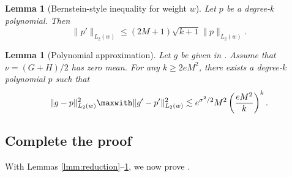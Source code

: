\documentclass[letterpaper,11pt]{article}
\newcommand{\pth}[1]{\left( #1 \right)}
\newtheorem{lemma}[theorem]{Lemma}
\theoremstyle{definition}
\begin{document}
    \begin{lemma}[Bernstein-style inequality for weight $w$]
      \label{lmm:bernstein}
      Let $p$ be a degree-$k$ polynomial.  Then
      \[
        \|p'\|_{L_2(w)}
        \leq (2M+1)\sqrt{k+1} \|p\|_{L_2(w)}.
      \]
    \end{lemma}

    \begin{lemma}[Polynomial approximation]
      \label{lmm:poly-f}
      Let $g$ be given in . Assume that $\nu = (G+H)/2$ has zero mean.
      For any $k \geq 2e M^2$,
      there exists a degree-$k$ polynomial $p$ such that
      \[
        \|g-p\|_{L_2(w)}^2 \maxwith
        \|g'-p'\|_{L_2(w)}^2
        \lesssim e^{\sigma^2/2} M^2 \pth{\frac{eM^2}{k}}^k.
      \]
    \end{lemma}

\subsection{Complete the proof}
With Lemmas \ref{lmm:reduction}--\ref{lmm:poly-f}, we now prove .
\end{document}
